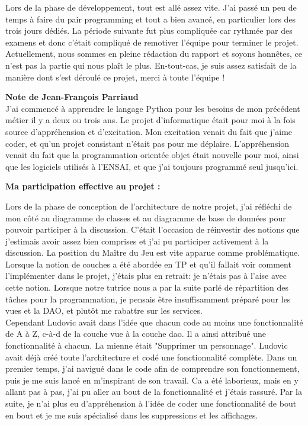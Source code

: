 \documentclass[11pt]{article}
\begin{document}
\bigbreak

Lors de la phase de développement, tout est allé assez vite. J'ai passé un peu de temps à faire du pair programming et tout a bien avancé, en particulier lors des trois jours dédiés. La période suivante fut plus compliquée car rythmée par des examens et donc c'était compliqué de remotiver l'équipe pour terminer le projet. Actuellement, nous sommes en pleine rédaction du rapport et soyons honnêtes, ce n'est pas la partie qui nous plaît le plus. En-tout-cas, je suis assez satisfait de la manière dont s'est déroulé ce projet, merci à toute l'équipe !



\newpage

\textbf{\Large Note de Jean-François Parriaud}\\

J'ai commencé à apprendre le langage Python pour les besoins de mon précédent métier il y a deux ou trois ans. Le projet d’informatique était pour moi à la fois source d'appréhension et d'excitation. Mon excitation venait du fait que j'aime coder, et qu'un projet consistant n'était pas pour me déplaire. L'appréhension venait du fait que la programmation orientée objet était nouvelle pour moi, ainsi que les logiciels utilisés à l'ENSAI, et que j'ai toujours programmé seul jusqu'ici.

\bigbreak
\textbf{ Ma participation effective au projet : }

Lors de la phase de conception de l’architecture de notre projet,
j'ai réfléchi de mon côté au diagramme de classes et au diagramme de base de données pour pouvoir participer à la discussion. C'était l'occasion de réinvestir des notions que j'estimais avoir assez bien comprises et j'ai pu participer activement à la discussion. La position du Maître du Jeu est vite apparue comme problématique.\\
Lorsque la notion de couches a été abordée en TP et qu'il fallait voir comment l'implémenter dans le projet, j'étais plus en retrait: je n'étais pas à l'aise avec cette notion. Lorsque notre tutrice nous a par la suite parlé de répartition des tâches pour la programmation, je pensais être insuffisamment préparé pour les vues et la DAO, et plutôt me rabattre sur les services.\\

Cependant Ludovic avait dans l'idée que chacun code au moins une fonctionnalité de A à Z, c-à-d de la couche vue à la couche dao. Il a ainsi attribué une fonctionnalité à chacun. La mienne était "Supprimer un personnage". Ludovic avait déjà créé toute l'architecture et codé une fonctionnalité complète. Dans un premier temps, j'ai navigué dans le code afin de comprendre son fonctionnement, puis je me suis lancé en m'inspirant de son travail. Ca a été laborieux, mais en y allant pas à pas, j'ai pu aller au bout de la fonctionnalité et j'étais rassuré. Par la suite, je n'ai plus eu d'appréhension à l'idée de coder une fonctionnalité de bout en bout et je me suis spécialisé dans les suppressions et les affichages.\\
\end{document}
